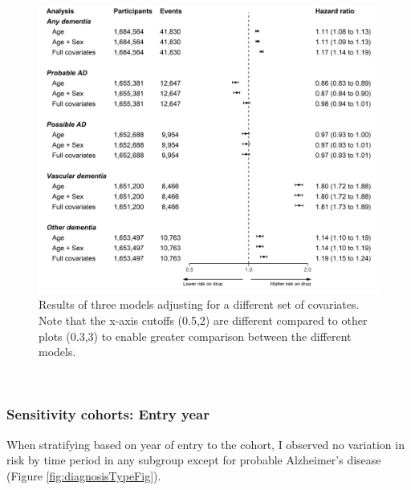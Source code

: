 \documentclass[a4paper, twoside]{templates/ociamthesis}
\begin{document}
\begin{figure}[H]
\includegraphics[width=1\linewidth]{figures/cprd-analysis/forester_unadjusted} \caption[Comparison of different combinations of covariates]{Results of three models adjusting for a different set of covariates. Note that the x-axis cutoffs (0.5,2) are different compared to other plots (0.3,3) to enable greater comparison between the different models.}\label{fig:unadjustedComparisonFig}
\end{figure}

~

\hypertarget{sensitivity-cohorts-entry-year}{%
\subsubsection{Sensitivity cohorts: Entry year}\label{sensitivity-cohorts-entry-year}}

When stratifying based on year of entry to the cohort, I observed no variation in risk by time period in any subgroup except for probable Alzheimer's disease (Figure \ref{fig:diagnosisTypeFig}).

~
\end{document}
